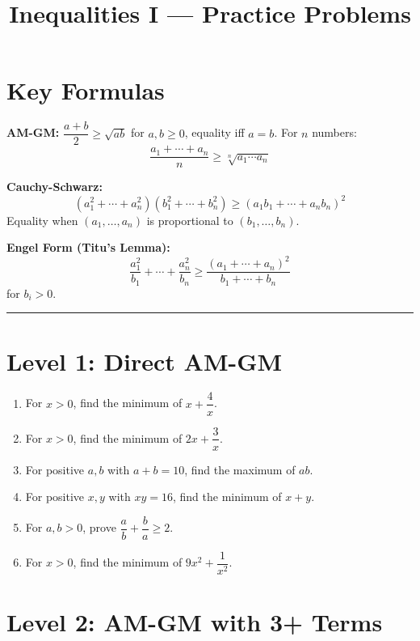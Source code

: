 \documentclass{article}
\title{Inequalities I — Practice Problems}
\author{}
\date{}
\begin{document}
\maketitle

\section*{Key Formulas}

\textbf{AM-GM:} $\dfrac{a + b}{2} \geq \sqrt{ab}$ for $a,b \geq 0$, equality iff $a = b$.
For $n$ numbers:
\[
\frac{a_1 + \cdots + a_n}{n} \geq \sqrt[n]{a_1 \cdots a_n}
\]

\textbf{Cauchy-Schwarz:}
\[
(a_1^2 + \cdots + a_n^2)(b_1^2 + \cdots + b_n^2) \geq (a_1b_1 + \cdots + a_nb_n)^2
\]
Equality when $(a_1,\dots,a_n)$ is proportional to $(b_1,\dots,b_n)$.

\textbf{Engel Form (Titu's Lemma):}
\[
\frac{a_1^2}{b_1} + \cdots + \frac{a_n^2}{b_n} \geq \frac{(a_1 + \cdots + a_n)^2}{b_1 + \cdots + b_n}
\]
for $b_i > 0$.

\bigskip
\hrule

\section{Level 1: Direct AM-GM}

\begin{enumerate}
  \item For $x > 0$, find the minimum of $x + \dfrac{4}{x}$.

  \item For $x > 0$, find the minimum of $2x + \dfrac{3}{x}$.

  \item For positive $a,b$ with $a + b = 10$, find the maximum of $ab$.

  \item For positive $x,y$ with $xy = 16$, find the minimum of $x + y$.

  \item For $a,b > 0$, prove $\dfrac{a}{b} + \dfrac{b}{a} \geq 2$.

  \item For $x > 0$, find the minimum of $9x^2 + \dfrac{1}{x^2}$.
\end{enumerate}

\section{Level 2: AM-GM with 3+ Terms}
\end{document}
